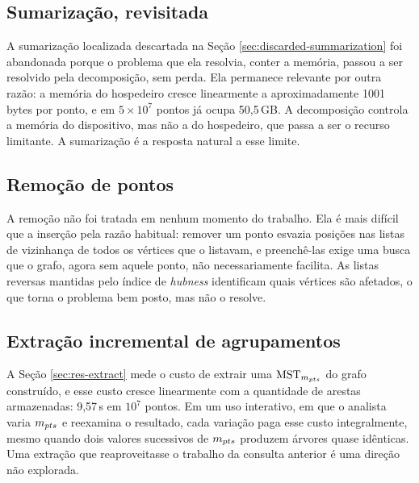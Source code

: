 \subsection{Sumarização, revisitada\label{sec:fut-summarization}}

A sumarização localizada descartada na Seção \ref{sec:discarded-summarization} foi abandonada porque o problema que ela resolvia, conter a memória, passou a ser resolvido pela decomposição, sem perda. Ela permanece relevante por outra razão: a memória do hospedeiro cresce linearmente a aproximadamente 1001 bytes por ponto, e em $5 \times 10^7$ pontos já ocupa 50,5\,GB. A decomposição controla a memória do dispositivo, mas não a do hospedeiro, que passa a ser o recurso limitante. A sumarização é a resposta natural a esse limite.\\

\subsection{Remoção de pontos\label{sec:fut-deletion}}

A remoção não foi tratada em nenhum momento do trabalho. Ela é mais difícil que a inserção pela razão habitual: remover um ponto esvazia posições nas listas de vizinhança de todos os vértices que o listavam, e preenchê-las exige uma busca que o grafo, agora sem aquele ponto, não necessariamente facilita. As listas reversas mantidas pelo índice de \textit{hubness} identificam quais vértices são afetados, o que torna o problema bem posto, mas não o resolve.\\

\subsection{Extração incremental de agrupamentos\label{sec:fut-extraction}}

A Seção \ref{sec:res-extract} mede o custo de extrair uma $\mathrm{MST}_{m_{pts}}$ do grafo construído, e esse custo cresce linearmente com a quantidade de arestas armazenadas: 9,57\,s em $10^7$ pontos. Em um uso interativo, em que o analista varia $m_{pts}$ e reexamina o resultado, cada variação paga esse custo integralmente, mesmo quando dois valores sucessivos de $m_{pts}$ produzem árvores quase idênticas. Uma extração que reaproveitasse o trabalho da consulta anterior é uma direção não explorada.\\
